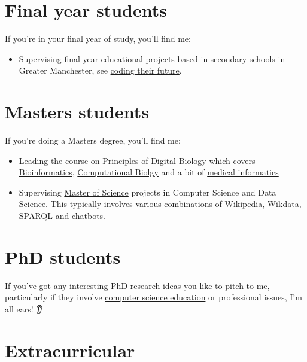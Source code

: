 \documentclass[
  12pt,
]{book}
\providecommand{\tightlist}{%
  \setlength{\itemsep}{0pt}\setlength{\parskip}{0pt}}
\begin{document}
\hypertarget{finalyear}{%
\section{Final year students}\label{finalyear}}

If you're in your final year of study, you'll find me:

\begin{itemize}
\tightlist
\item
  Supervising final year educational projects based in secondary schools in Greater Manchester, see \protect\hyperlink{coding-their-future}{coding their future}. \citep{computinged} 👩‍💻👨‍💻
\end{itemize}

\hypertarget{masters}{%
\section{Masters students}\label{masters}}

If you're doing a Masters degree, you'll find me:

\begin{itemize}
\tightlist
\item
  Leading the course on \href{http://studentnet.cs.manchester.ac.uk/pgt/COMP60532/syllabus/}{Principles of Digital Biology} which covers \href{https://en.wikipedia.org/wiki/Bioinformatics}{Bioinformatics}, \href{https://en.wikipedia.org/wiki/Computational_biology}{Computational Biolgy} and a bit of \href{https://en.wikipedia.org/wiki/Health_informatics}{medical informatics} 🧬
\item
  Supervising \href{https://www.cs.manchester.ac.uk/study/masters/}{Master of Science} projects in Computer Science and Data Science. \citep{r4ds} This typically involves various combinations of Wikipedia, Wikdata, \href{https://en.wikipedia.org/wiki/SPARQL}{SPARQL} \citep{ducharme} and chatbots. 🤖 \citep{myca}
\end{itemize}

\hypertarget{phds}{%
\section{PhD students}\label{phds}}

If you've got any interesting PhD research ideas you like to pitch to me, particularly if they involve \href{https://sigcse.cs.manchester.ac.uk}{computer science education} or professional issues, I'm all ears! 👂

\hypertarget{extracurricular}{%
\section{Extracurricular}\label{extracurricular}}
\end{document}
